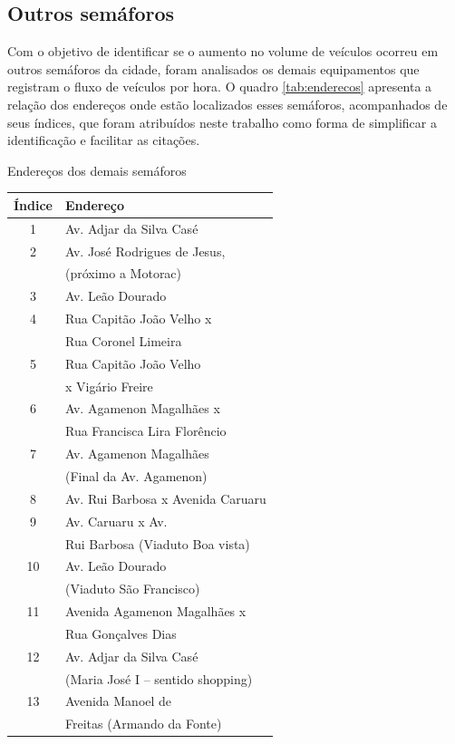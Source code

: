\subsection{Outros semáforos}
Com o objetivo de identificar se o aumento no volume de veículos ocorreu em outros semáforos da cidade, foram analisados os demais equipamentos que registram o fluxo de veículos por hora. O quadro \ref{tab:enderecos} apresenta a relação dos endereços onde estão localizados esses semáforos, acompanhados de seus índices, que foram atribuídos neste trabalho como forma de simplificar a identificação e facilitar as citações.






\begin{quadro}[H]
\centering
\caption{Endereços dos demais semáforos}
\begin{tabular}{|c|l|}
\hline
\textbf{Índice} & \textbf{Endereço} \\ \hline
1  & Av. Adjar da Silva Casé \\ \hline
2  & Av. José Rodrigues de Jesus,\\ &(próximo a Motorac) \\ \hline
3  & Av. Leão Dourado \\ \hline
4  & Rua Capitão João Velho x\\& Rua Coronel Limeira \\ \hline
5  & Rua Capitão João Velho\\& x Vigário Freire \\ \hline
6  & Av. Agamenon Magalhães x\\& Rua Francisca Lira Florêncio \\ \hline
7  & Av. Agamenon Magalhães\\& (Final da Av. Agamenon) \\ \hline
8  & Av. Rui Barbosa x Avenida Caruaru \\ \hline
9  & Av. Caruaru x Av.\\& Rui Barbosa (Viaduto Boa vista) \\ \hline
10 & Av. Leão Dourado \\&(Viaduto São Francisco) \\ \hline
11 & Avenida Agamenon Magalhães x\\& Rua Gonçalves Dias \\ \hline
12 & Av. Adjar da Silva Casé\\& (Maria José I – sentido shopping) \\ \hline
13 & Avenida Manoel de\\& Freitas (Armando da Fonte) \\ \hline

\end{tabular}
\end{quadro}
